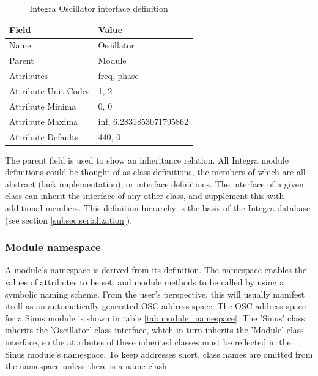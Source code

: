 \begin{table}
\begin{center}
\begin{tabular}{|l|l|}
\hline
\textbf{Field} & \textbf{Value} \\
\hline
Name  & Oscillator \\
\hline
Parent  & Module \\
\hline
Attributes & freq, phase \\
\hline
Attribute Unit Codes & 1, 2 \\
\hline
Attribute Minima & 0, 0 \\
\hline
Attribute Maxima & inf, 6.2831853071795862 \\
\hline
Attribute Defaults & 440, 0 \\
\hline
\end{tabular} 
\end{center}
\caption{Integra Oscillator interface definition}
\label{tab:module_definition}
\end{table}

The parent field is used to show an inheritance relation. All Integra module definitions could be thought of as class definitions, the members of which are all abstract (lack implementation), or interface definitions. The interface of a given class can inherit the interface of any other class, and supplement this with additional members. This definition hierarchy is the basis of the Integra database (see section \ref{subsec:serialization}). 

\subsubsection{Module namespace}\label{subsubsec:module_namespace}

A module's namespace is derived from its definition. The namespace
enables the values of attributes to be set, and module methods to be
called by using a symbolic naming scheme.  From the user's
perspective, this will usually manifest itself as an automatically
generated OSC address space. The OSC address space for a Sinus module
is shown in table \ref{tab:module_namespace}. The 'Sinus' class
inherits the 'Oscillator' class interface, which in turn inherits the
'Module' class interface, so the attributes of these inherited classes
must be reflected in the Sinus module's namespace. To keep addresses
short, class names are omitted from the namespace unless there is a
name clash.

